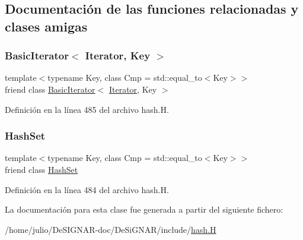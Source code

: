 \subsection{Documentación de las funciones relacionadas y clases amigas}
\mbox{\label{class_designar_1_1_hash_set_1_1_iterator_a0b375a570add16b09037ce1773f0ddbb}} 
\subsubsection{\texorpdfstring{Basic\+Iterator$<$ Iterator, Key $>$}{BasicIterator< Iterator, Key >}}
{\footnotesize\ttfamily template$<$typename Key, class Cmp = std\+::equal\+\_\+to$<$\+Key$>$$>$ \\
friend class \hyperlink{class_designar_1_1_basic_iterator}{Basic\+Iterator}$<$ \hyperlink{class_designar_1_1_hash_set_1_1_iterator}{Iterator}, Key $>$\hspace{0.3cm}{\ttfamily [friend]}}



Definición en la línea 485 del archivo hash.\+H.

\mbox{\label{class_designar_1_1_hash_set_1_1_iterator_ac5220f06200dc3b0d55d050a940f17b9}} 
\subsubsection{\texorpdfstring{Hash\+Set}{HashSet}}
{\footnotesize\ttfamily template$<$typename Key, class Cmp = std\+::equal\+\_\+to$<$\+Key$>$$>$ \\
friend class \hyperlink{class_designar_1_1_hash_set}{Hash\+Set}\hspace{0.3cm}{\ttfamily [friend]}}



Definición en la línea 484 del archivo hash.\+H.



La documentación para esta clase fue generada a partir del siguiente fichero\+:\begin{DoxyCompactItemize}
\item 
/home/julio/\+De\+S\+I\+G\+N\+A\+R-\/doc/\+De\+Si\+G\+N\+A\+R/include/\hyperlink{hash_8_h}{hash.\+H}\end{DoxyCompactItemize}
